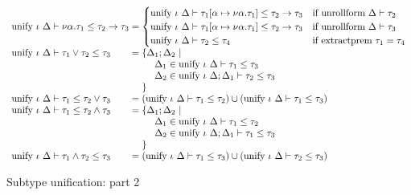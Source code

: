 \documentclass[sigplan,screen]{acmart}
\begin{document}
\begin{figure*}[h]
\[\begin{array}{l @{} l}
      \\
      \text{unify } \iota\ \Delta \vdash
      \nu \alpha . \tau_1 \leq 
      \tau_2 \rightarrow \tau_3
      &{} = 
      \begin{cases}
        \text{unify } \iota\ \Delta \vdash
        \tau_1[\alpha\mapsto\nu\alpha.\tau_1]
        \leq 
        \tau_2 \rightarrow \tau_3
        &\text{if }
        \text{unrollform } \Delta \vdash \tau_2
        \\
        \text{unify } \iota\ \Delta \vdash
        \tau_1[\alpha\mapsto\nu\alpha.\tau_1]
        \leq 
        \tau_2 \rightarrow \tau_3
        &\text{if }
        \text{unrollform } \Delta \vdash \tau_3
        \\
        \text{unify } \iota\ \Delta \vdash \tau_2 \leq \tau_4
        &\text{if }
        \text{extractprem } \tau_1 = \tau_4
      \end{cases}

      \\
      \text{unify } \iota\ \Delta \vdash
      \tau_1 \vee \tau_2 \leq \tau_3
      &{} = 
      \begin{array}[t]{@{} l}
        \{\Delta_1;\Delta_2\ |
        \\ 
        \ \ \ \ \Delta_1 \in \text{unify } \iota\ \Delta \vdash \tau_1 \leq \tau_3
        \\
        \ \ \ \ \Delta_2 \in \text{unify } \iota\ \Delta;\Delta_1 \vdash \tau_2 \leq \tau_3
        \\
        \}
      \end{array}

      \\
      \text{unify } \iota\ \Delta \vdash
      \tau_1 \leq \tau_2 \vee \tau_3
      &{} = 
      (\text{unify } \iota\ \Delta \vdash \tau_1 \leq \tau_2)
      \cup
      (\text{unify } \iota\ \Delta \vdash \tau_1 \leq \tau_3)

      \\
      \text{unify } \iota\ \Delta \vdash
      \tau_1 \leq \tau_2 \wedge \tau_3
      &{} = 
      \begin{array}[t]{@{} l}
        \{\Delta_1;\Delta_2\ |
        \\ 
        \ \ \ \ \Delta_1 \in \text{unify } \iota\ \Delta \vdash \tau_1 \leq \tau_2
        \\
        \ \ \ \ \Delta_2 \in \text{unify } \iota\ \Delta;\Delta_1 \vdash \tau_1 \leq \tau_3
        \\
        \}
      \end{array}

      \\
      \text{unify } \iota\ \Delta \vdash
      \tau_1 \wedge \tau_2 \leq \tau_3
      &{} = 
      (\text{unify } \iota\ \Delta \vdash \tau_1 \leq \tau_3)
      \cup
      (\text{unify } \iota\ \Delta \vdash \tau_2 \leq \tau_3)

    \end{array}
  \]
  \caption{Subtype unification: part 2}
\end{figure*}
\end{document}
